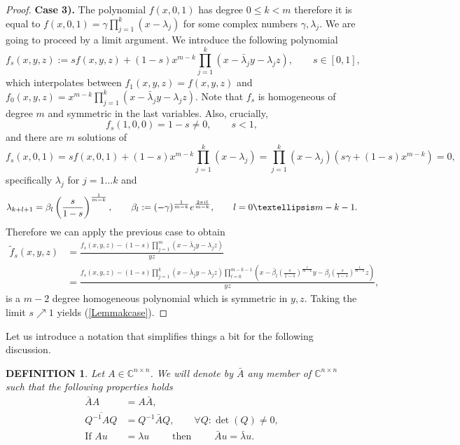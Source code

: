 \documentclass[10pt,a4paper,reqno]{amsart}
\newtheorem{defi}{\bf D\scriptsize EFINITION \normalsize}
\newenvironment{definition}{\begin{defi}\rm}{\end{defi}}
\newcommand{\zav}[1]{\left( #1 \right)}
\newcommand{\imag}{{\rm i}}
\newcommand{\deter}[1]{\det\zav{#1}}
\begin{document}
\begin{proof}
\textbf{Case 3).} The polynomial $f(x,0,1)$ has degree $0\leq k<m$ therefore it is equal to $f(x,0,1)=\gamma\prod_{j=1}^k(x-\lambda_j)$ for some complex numbers $\gamma,\lambda_j$. We are going to proceed by a limit argument. We introduce the following polynomial
$$
f_s(x,y,z):=sf(x,y,z)+(1-s)x^{m-k}\prod\limits_{j=1}^k\zav{x-\bar\lambda_j y-\lambda_j z},\qquad s\in [0,1],
$$
which interpolates between $f_1(x,y,z)=f(x,y,z)$ and $f_0(x,y,z)=x^{m-k}\prod_{j=1}^k\zav{x-\bar\lambda_j y-\lambda_j z}$. Note that $f_s$ is homogeneous of degree $m$ and symmetric in the last variables. Also, crucially, 
$$
f_s(1,0,0)=1-s\not=0,\qquad  s<1, 
$$ 
and there are $m$ solutions of 
$$
f_s(x,0,1)=sf(x,0,1)+(1-s)x^{m-k}\prod_{j=1}^k(x-\lambda_j)=\prod_{j=1}^k(x-\lambda_j)\zav{s\gamma+(1-s)x^{m-k}}=0,
$$ 
specifically $\lambda_j$ for $j=1\dots k$ and 
$$
\lambda_{k+l+1}=\beta_l \zav{\frac{s}{1-s}}^{\frac{1}{m-k}},\qquad \beta_l:=(-\gamma)^{\frac{1}{m-k}}e^{\frac{2\pi\imag l}{m-k}},\qquad l=0\dots m-k-1.
$$
Therefore we can apply the previous case to obtain
\begin{align*}
\tilde f_s(x,y,z)&=\frac{f_s(x,y,z)-(1-s)\prod\limits_{j=1}^{m}(x-\bar \lambda_j y-\lambda_j z)}{yz}\\
&=\frac{f_s(x,y,z)-(1-s)\prod\limits_{j=1}^k(x-\bar\lambda_j y-\lambda_j z)\prod\limits_{l=0}^{m-k-1}\zav{x-\bar \beta_l \zav{\frac{s}{1-s}}^{\frac{1}{m-k}}y-\beta_l \zav{\frac{s}{1-s}}^{\frac{1}{m-k}}z}}{yz},
\end{align*}
is a $m-2$ degree homogeneous polynomial which is symmetric in $y,z$.
Taking the limit $s\nearrow 1$ yields (\ref{Lemmakcase}).


\end{proof}
Let us introduce a notation that simplifies things a bit for the following discussion.
\begin{definition}
Let $A\in\mathbb{C}^{n\times n}$. We will denote by $\bar A$ \textit{any} member of $\mathbb{C}^{n\times n}$ such that the following properties holds
\begin{align}
\bar AA&=A\bar A,\\
\overline{Q^{-1}AQ}&=Q^{-1}\bar A Q,\qquad \forall Q: \deter{Q}\not=0,\\
\text{If }Au&=\lambda u\qquad \text{  then  }\qquad\bar A u=\bar \lambda u.
\end{align}
\end{definition}
\end{document}
